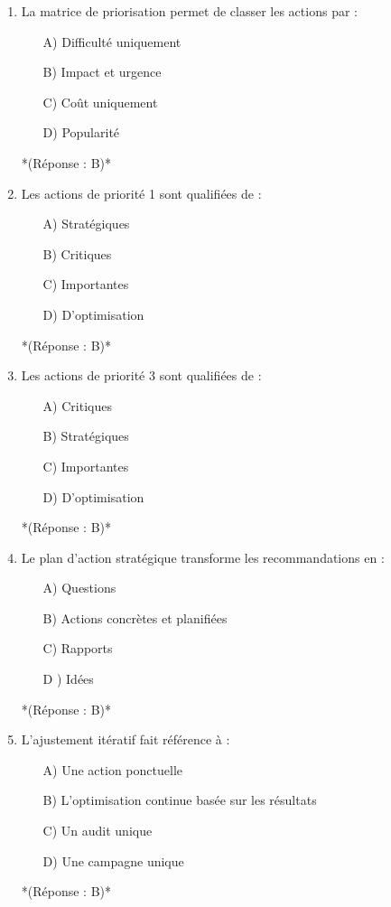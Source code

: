\documentclass[12pt,a4paper,twoside]{report}
\begin{document}
\begin{enumerate}
    \item La matrice de priorisation permet de classer les actions par :
    \begin{itemize}
        \item[A)] Difficulté uniquement
        \item[B)] Impact et urgence
        \item[C)] Coût uniquement
        \item[D)] Popularité
    \end{itemize}
    *(Réponse : B)*

    \item Les actions de priorité 1 sont qualifiées de :
    \begin{itemize}
        \item[A)] Stratégiques
        \item[B)] Critiques
        \item[C)] Importantes
        \item[D)] D'optimisation
    \end{itemize}
    *(Réponse : B)*

    \item Les actions de priorité 3 sont qualifiées de :
    \begin{itemize}
        \item[A)] Critiques
        \item[B)] Stratégiques
        \item[C)] Importantes
        \item[D)] D'optimisation
    \end{itemize}
    *(Réponse : B)*

    \item Le plan d'action stratégique transforme les recommandations en :
    \begin{itemize}
        \item[A)] Questions
        \item[B)] Actions concrètes et planifiées
        \item[C)] Rapports
        \item[D]) Idées
    \end{itemize}
    *(Réponse : B)*

    \item L'ajustement itératif fait référence à :
    \begin{itemize}
        \item[A)] Une action ponctuelle
        \item[B)] L'optimisation continue basée sur les résultats
        \item[C)] Un audit unique
        \item[D)] Une campagne unique
    \end{itemize}
    *(Réponse : B)*


\end{enumerate}
\end{document}
